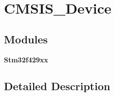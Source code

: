 \section{C\+M\+S\+I\+S\+\_\+\+Device}
\label{group__CMSIS__Device}
\subsection*{Modules}
\begin{DoxyCompactItemize}
\item 
\textbf{ Stm32f429xx}
\end{DoxyCompactItemize}


\subsection{Detailed Description}
